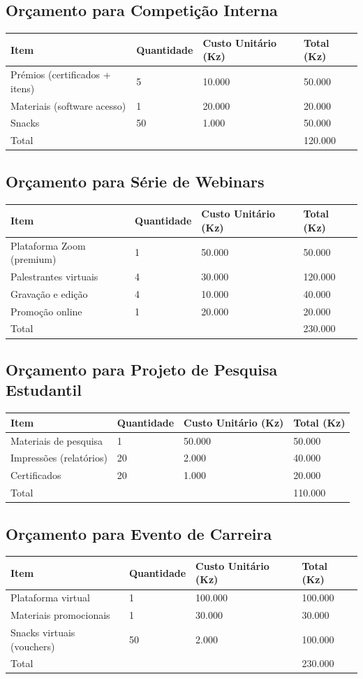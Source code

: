 \documentclass[12pt]{article}
\begin{document}
\subsection{Orçamento para Competição Interna}
\begin{longtable}{|l|l|l|l|}
\hline
Item & Quantidade & Custo Unitário (Kz) & Total (Kz) \\
\hline
Prémios (certificados + itens) & 5 & 10.000 & 50.000 \\
Materiais (software acesso) & 1 & 20.000 & 20.000 \\
Snacks & 50 & 1.000 & 50.000 \\
\hline
Total & & & 120.000 \\
\hline
\end{longtable}

\subsection{Orçamento para Série de Webinars}
\begin{longtable}{|l|l|l|l|}
\hline
Item & Quantidade & Custo Unitário (Kz) & Total (Kz) \\
\hline
Plataforma Zoom (premium) & 1 & 50.000 & 50.000 \\
Palestrantes virtuais & 4 & 30.000 & 120.000 \\
Gravação e edição & 4 & 10.000 & 40.000 \\
Promoção online & 1 & 20.000 & 20.000 \\
\hline
Total & & & 230.000 \\
\hline
\end{longtable}

\subsection{Orçamento para Projeto de Pesquisa Estudantil}
\begin{longtable}{|l|l|l|l|}
\hline
Item & Quantidade & Custo Unitário (Kz) & Total (Kz) \\
\hline
Materiais de pesquisa & 1 & 50.000 & 50.000 \\
Impressões (relatórios) & 20 & 2.000 & 40.000 \\
Certificados & 20 & 1.000 & 20.000 \\
\hline
Total & & & 110.000 \\
\hline
\end{longtable}

\subsection{Orçamento para Evento de Carreira}
\begin{longtable}{|l|l|l|l|}
\hline
Item & Quantidade & Custo Unitário (Kz) & Total (Kz) \\
\hline
Plataforma virtual & 1 & 100.000 & 100.000 \\
Materiais promocionais & 1 & 30.000 & 30.000 \\
Snacks virtuais (vouchers) & 50 & 2.000 & 100.000 \\
\hline
Total & & & 230.000 \\
\hline
\end{longtable}
\end{document}
